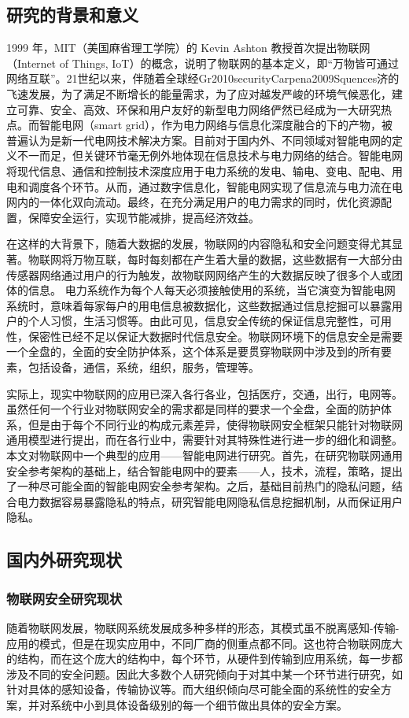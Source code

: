 \documentclass[10.5pt,twocolumn]{jbuaa}
\begin{document}
\subsection{研究的背景和意义}
1999 年，MIT（美国麻省理工学院）的 Kevin Ashton 教授首次提出物联网（Internet of Things, IoT）的概念，说明了物联网的基本定义，即“万物皆可通过网络互联”。21世纪以来，伴随着全球经Gr2010securityCarpena2009Squences济的飞速发展，为了满足不断增长的能量需求，为了应对越发严峻的环境气候恶化，建立可靠、安全、高效、环保和用户友好的新型电力网络俨然已经成为一大研究热点。而智能电网（smart grid），作为电力网络与信息化深度融合的下的产物，被普遍认为是新一代电网技术解决方案。目前对于国内外、不同领域对智能电网的定义不一而足，但关键环节毫无例外地体现在信息技术与电力网络的结合。智能电网将现代信息、通信和控制技术深度应用于电力系统的发电、输电、变电、配电、用电和调度各个环节。从而，通过数字信息化，智能电网实现了信息流与电力流在电网内的一体化双向流动。最终，在充分满足用户的电力需求的同时，优化资源配置，保障安全运行，实现节能减排，提高经济效益。

在这样的大背景下，随着大数据的发展，物联网的内容隐私和安全问题变得尤其显著。物联网将万物互联，每时每刻都在产生着大量的数据，这些数据有一大部分由传感器网络通过用户的行为触发，故物联网网络产生的大数据反映了很多个人或团体的信息。
电力系统作为每个人每天必须接触使用的系统，当它演变为智能电网系统时，意味着每家每户的用电信息被数据化，这些数据通过信息挖掘可以暴露用户的个人习惯，生活习惯等。由此可见，信息安全传统的保证信息完整性，可用性，保密性已经不足以保证大数据时代信息安全。物联网环境下的信息安全是需要一个全盘的，全面的安全防护体系，这个体系是要贯穿物联网中涉及到的所有要素，包括设备，通信，系统，组织，服务，管理等。

实际上，现实中物联网的应用已深入各行各业，包括医疗，交通，出行，电网等。虽然任何一个行业对物联网安全的需求都是同样的要求一个全盘，全面的防护体系，但是由于每个不同行业的构成元素差异，使得物联网安全框架只能针对物联网通用模型进行提出，而在各行业中，需要针对其特殊性进行进一步的细化和调整。本文对物联网中一个典型的应用——智能电网进行研究。首先，在研究物联网通用安全参考架构的基础上，结合智能电网中的要素——人，技术，流程，策略，提出了一种尽可能全面的智能电网安全参考架构。之后，基础目前热门的隐私问题，结合电力数据容易暴露隐私的特点，研究智能电网隐私信息挖掘机制，从而保证用户隐私。

\subsection{国内外研究现状}
\subsubsection{物联网安全研究现状}
随着物联网发展，物联网系统发展成多种多样的形态，其模式虽不脱离感知-传输-应用的模式，但是在现实应用中，不同厂商的侧重点都不同。这也符合物联网庞大的结构，而在这个庞大的结构中，每个环节，从硬件到传输到应用系统，每一步都涉及不同的安全问题。因此大多数个人研究倾向于对其中某一个环节进行研究，如针对具体的感知设备，传输协议等。而大组织倾向尽可能全面的系统性的安全方案，并对系统中小到具体设备级别的每一个细节做出具体的安全方案。
\end{document}
